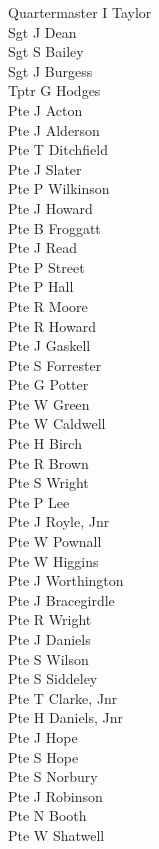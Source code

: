 \begin{multicols}{3}
  \small
  \noindent
  Quartermaster I Taylor \\
  Sgt J Dean \\
  Sgt S Bailey \\
  Sgt J Burgess \\
  Tptr G Hodges \\
  Pte J Acton \\
  Pte J Alderson \\
  Pte T Ditchfield \\
  Pte J Slater \\
  Pte P Wilkinson \\
  Pte J Howard \\
  Pte B Froggatt \\
  Pte J Read \\
  Pte P Street \\
  Pte P Hall \\
  Pte R Moore \\
  Pte R Howard \\
  Pte J Gaskell \\
  Pte S Forrester \\
  Pte G Potter \\
  Pte W Green \\
  Pte W Caldwell \\
  Pte H Birch \\
  Pte R Brown \\
  Pte S Wright \\
  Pte P Lee \\
  Pte J Royle, Jnr \\
  Pte W Pownall \\
  Pte W Higgins \\
  Pte J Worthington \\
  Pte J Bracegirdle \\
  Pte R Wright \\
  Pte J Daniels \\
  Pte S Wilson \\
  Pte S Siddeley \\
  Pte T Clarke, Jnr \\
  Pte H Daniels, Jnr \\
  Pte J Hope \\
  Pte S Hope \\
  Pte S Norbury \\
  Pte J Robinson \\
  Pte N Booth \\
  Pte W Shatwell \\

\end{multicols}
